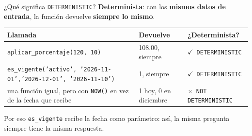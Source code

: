 \documentclass[aspectratio=169,10pt,c]{beamer}
\newcommand{\si}{$\checkmark$}
\newcommand{\no}{\textcolor{utpRojo}{$\times$}}
\begin{document}
\begin{frame}{¿Qué significa \texttt{DETERMINISTIC}?}
\small \textbf{Determinista}: con los \textbf{mismos datos de entrada}, la función devuelve \textbf{siempre lo mismo}.
\vspace{0.2cm}
\begin{center}
\footnotesize
\renewcommand{\arraystretch}{1.3}
\begin{tabular}{@{}>{\raggedright}p{6.6cm}>{\raggedright}p{2.9cm}>{\raggedright\arraybackslash}p{3.1cm}@{}}
\toprule
\bfseries Llamada & \bfseries Devuelve & \bfseries ¿Determinista? \\
\midrule
\texttt{aplicar\_porcentaje(120, 10)} & 108.00, siempre & \si\ \texttt{DETERMINISTIC} \\
\texttt{\scriptsize es\_vigente('activo', '2026-11-01',\newline\hspace*{1.5em}'2026-12-01', '2026-11-10')} & 1, siempre & \si\ \texttt{DETERMINISTIC} \\
una función igual, pero con \texttt{NOW()} en vez de la fecha que recibe & 1 hoy, 0 en diciembre & \no\ \texttt{NOT DETERMINISTIC} \\
\bottomrule
\end{tabular}
\end{center}
\vspace{0.1cm}
\small Por eso \texttt{es\_vigente} recibe la fecha como parámetro: así, la misma pregunta siempre tiene la misma respuesta.
\end{frame}
\end{document}
